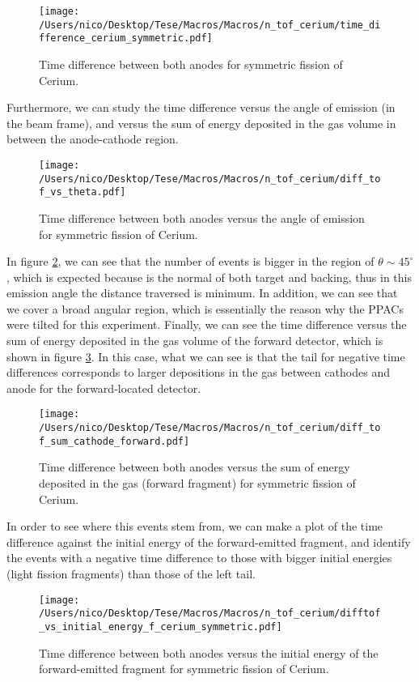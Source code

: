 \documentclass{article}
\begin{document}
\begin{figure}[H]
    \centering
    \texttt{[image: /Users/nico/Desktop/Tese/Macros/Macros/n\_tof\_cerium/time\_difference\_cerium\_symmetric.pdf]}
    \caption{Time difference between both anodes for symmetric fission of Cerium.}
    \label{fig:time_diff_sym}
\end{figure}
Furthermore, we can study the time difference versus the angle of emission (in the beam frame), and versus the sum of energy deposited in the gas volume in between the anode-cathode region.

\begin{figure}[H]
    \centering
    \texttt{[image: /Users/nico/Desktop/Tese/Macros/Macros/n\_tof\_cerium/diff\_tof\_vs\_theta.pdf]}
    \caption{Time difference between both anodes versus the angle of emission for symmetric fission of Cerium.}
    \label{fig:time_diff_costheta_sym}
\end{figure}
In figure \ref{fig:time_diff_costheta_sym}, we can see that the number of events is bigger in the region of $\theta \sim 45^{\circ}$, which is expected because is the normal of both target and backing, thus in this emission angle the distance traversed is minimum. In addition, we can see that we cover a broad angular region, which is essentially the reason why the PPACs were tilted for this experiment.
Finally, we can see the time difference versus the sum of energy deposited in the gas volume of the forward detector, which is shown in figure \ref{fig:time_diff_energy_sym}. In this case, what we can see is that the tail for negative time differences corresponds to larger depositions in the gas between cathodes and anode for the forward-located detector. 
\begin{figure}[H]
    \centering
    \texttt{[image: /Users/nico/Desktop/Tese/Macros/Macros/n\_tof\_cerium/diff\_tof\_sum\_cathode\_forward.pdf]}
    \caption{Time difference between both anodes versus the sum of energy deposited in the gas (forward fragment) for symmetric fission of Cerium.}
    \label{fig:time_diff_energy_sym}
\end{figure}
In order to see where this events stem from, we can make a plot of the time difference against the initial energy of the forward-emitted fragment, and identify the events with a negative time difference to those with bigger initial energies (light fission fragments) than those of the left tail.
\begin{figure}[H]
    \centering
    \texttt{[image: /Users/nico/Desktop/Tese/Macros/Macros/n\_tof\_cerium/difftof\_vs\_initial\_energy\_f\_cerium\_symmetric.pdf]}
    \caption{Time difference between both anodes versus the initial energy of the forward-emitted fragment for symmetric fission of Cerium.}
    \label{fig:time_diff_initial_energy_sym}
\end{figure}
\end{document}
